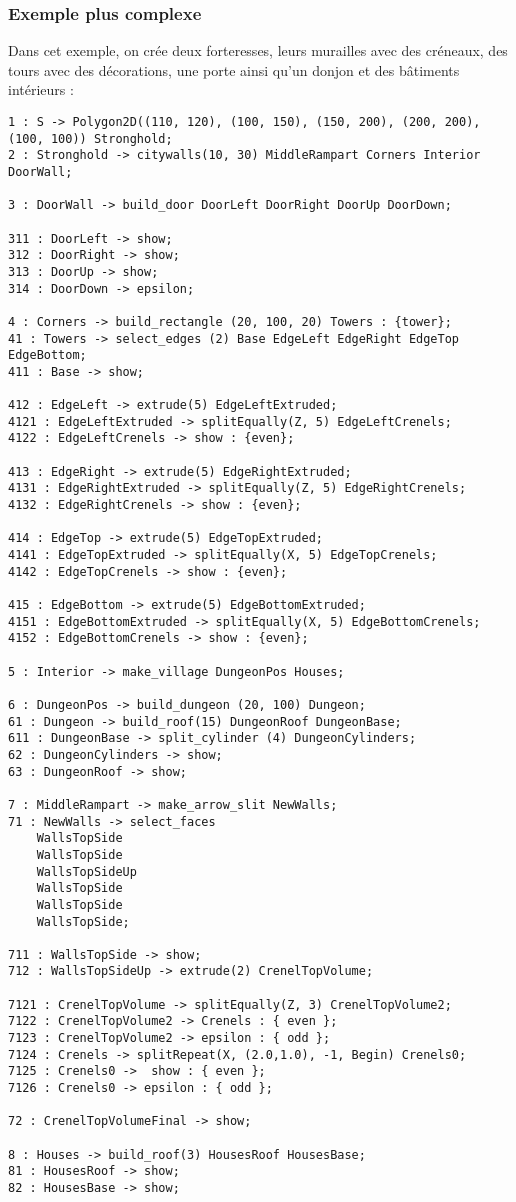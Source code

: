 \documentclass[a4paper,11pt]{article}
\begin{document}
\subsubsection{Exemple plus complexe}
Dans cet exemple, on crée deux forteresses, leurs murailles avec des créneaux, des tours avec des décorations, une porte ainsi qu'un donjon et des bâtiments intérieurs :
\begin{verbatim}
1 : S -> Polygon2D((110, 120), (100, 150), (150, 200), (200, 200), (100, 100)) Stronghold;
2 : Stronghold -> citywalls(10, 30) MiddleRampart Corners Interior DoorWall;

3 : DoorWall -> build_door DoorLeft DoorRight DoorUp DoorDown;

311 : DoorLeft -> show;
312 : DoorRight -> show;
313 : DoorUp -> show;
314 : DoorDown -> epsilon;

4 : Corners -> build_rectangle (20, 100, 20) Towers : {tower};
41 : Towers -> select_edges (2) Base EdgeLeft EdgeRight EdgeTop EdgeBottom;
411 : Base -> show;

412 : EdgeLeft -> extrude(5) EdgeLeftExtruded;
4121 : EdgeLeftExtruded -> splitEqually(Z, 5) EdgeLeftCrenels;
4122 : EdgeLeftCrenels -> show : {even};

413 : EdgeRight -> extrude(5) EdgeRightExtruded;
4131 : EdgeRightExtruded -> splitEqually(Z, 5) EdgeRightCrenels;
4132 : EdgeRightCrenels -> show : {even};

414 : EdgeTop -> extrude(5) EdgeTopExtruded;
4141 : EdgeTopExtruded -> splitEqually(X, 5) EdgeTopCrenels;
4142 : EdgeTopCrenels -> show : {even};

415 : EdgeBottom -> extrude(5) EdgeBottomExtruded;
4151 : EdgeBottomExtruded -> splitEqually(X, 5) EdgeBottomCrenels;
4152 : EdgeBottomCrenels -> show : {even};

5 : Interior -> make_village DungeonPos Houses;

6 : DungeonPos -> build_dungeon (20, 100) Dungeon;
61 : Dungeon -> build_roof(15) DungeonRoof DungeonBase;
611 : DungeonBase -> split_cylinder (4) DungeonCylinders;
62 : DungeonCylinders -> show;
63 : DungeonRoof -> show;

7 : MiddleRampart -> make_arrow_slit NewWalls;
71 : NewWalls -> select_faces
    WallsTopSide
    WallsTopSide
    WallsTopSideUp
    WallsTopSide
    WallsTopSide
    WallsTopSide;

711 : WallsTopSide -> show;
712 : WallsTopSideUp -> extrude(2) CrenelTopVolume;

7121 : CrenelTopVolume -> splitEqually(Z, 3) CrenelTopVolume2;
7122 : CrenelTopVolume2 -> Crenels : { even };
7123 : CrenelTopVolume2 -> epsilon : { odd };
7124 : Crenels -> splitRepeat(X, (2.0,1.0), -1, Begin) Crenels0;
7125 : Crenels0 ->  show : { even };
7126 : Crenels0 -> epsilon : { odd };

72 : CrenelTopVolumeFinal -> show;

8 : Houses -> build_roof(3) HousesRoof HousesBase;
81 : HousesRoof -> show;
82 : HousesBase -> show;
\end{verbatim}
\end{document}

